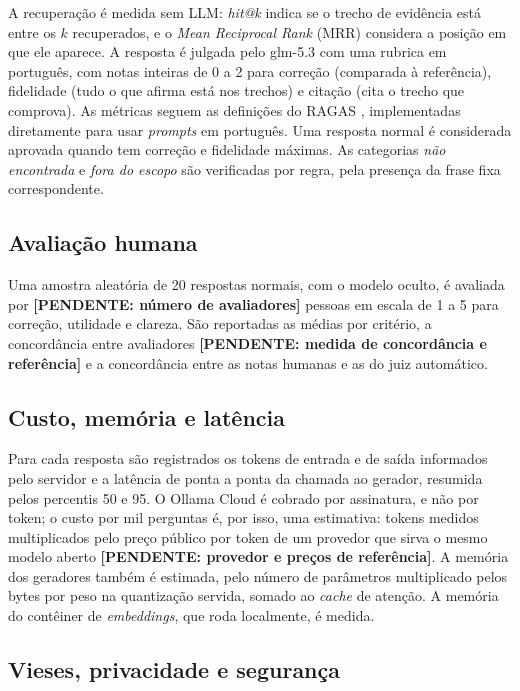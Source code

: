 \documentclass{sbc-template}
\newcommand{\pendente}[1]{\textbf{[PENDENTE: #1]}}
\begin{document}
A recuperação é medida sem LLM: \textit{hit@k} indica se o trecho de evidência está
entre os $k$ recuperados, e o \textit{Mean Reciprocal Rank} (MRR) considera a posição
em que ele aparece. A resposta é julgada pelo glm-5.3 com uma rubrica em português,
com notas inteiras de 0 a 2 para correção (comparada à referência), fidelidade (tudo o
que afirma está nos trechos) e citação (cita o trecho que comprova). As métricas
seguem as definições do RAGAS \cite{Es2023}, implementadas diretamente para usar
\textit{prompts} em português. Uma resposta normal é considerada aprovada quando tem
correção e fidelidade máximas. As categorias \textit{não encontrada} e \textit{fora do
escopo} são verificadas por regra, pela presença da frase fixa correspondente.

\subsection{Avaliação humana}
\label{sec:avaliacao-humana}

Uma amostra aleatória de 20 respostas normais, com o modelo oculto, é avaliada por
\pendente{número de avaliadores} pessoas em escala de 1 a 5 para correção, utilidade e
clareza. São reportadas as médias por critério, a concordância entre avaliadores
\pendente{medida de concordância e referência} e a concordância entre as notas
humanas e as do juiz automático.

\subsection{Custo, memória e latência}
\label{sec:custo}

Para cada resposta são registrados os tokens de entrada e de saída informados pelo
servidor e a latência de ponta a ponta da chamada ao gerador, resumida pelos
percentis 50 e 95. O Ollama Cloud é cobrado por assinatura, e não por token; o custo
por mil perguntas é, por isso, uma estimativa: tokens medidos multiplicados pelo preço
público por token de um provedor que sirva o mesmo modelo aberto
\pendente{provedor e preços de referência}. A memória dos geradores também é estimada,
pelo número de parâmetros multiplicado pelos bytes por peso na quantização servida,
somado ao \textit{cache} de atenção. A memória do contêiner de \textit{embeddings},
que roda localmente, é medida.

\subsection{Vieses, privacidade e segurança}
\label{sec:riscos}
\end{document}
